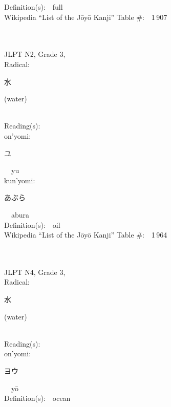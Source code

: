 \begin{multicols}{2}
Definition(s):\ \ full \\
Wikipedia ``List of the J\=oy\=o Kanji'' Table \#:\ \ 1\,907 \\
\ \ \\
{\fontsize{34pt}{40pt}  }\ \ \\  %
{JLPT N2, Grade 3, \\Radical:\ \ {\begin{CJK}{UTF8}{min} 水 \end{CJK}} (water) } \\
Reading(s):\ \ \\
{\hspace*{1em}}on'yomi:\ \ \\
{\hspace*{2em}}{\begin{CJK}{UTF8}{min} ユ \end{CJK}}\ \ yu\ \ \\
{\hspace*{1em}}kun'yomi:\ \ \\
{\hspace*{2em}}{\begin{CJK}{UTF8}{min} あぶら \end{CJK}}\ \ abura\ \ \\
Definition(s):\ \ oil \\
Wikipedia ``List of the J\=oy\=o Kanji'' Table \#:\ \ 1\,964 \\
\ \ \\
{\fontsize{34pt}{40pt}  }\ \ \\  %
{JLPT N4, Grade 3, \\Radical:\ \ {\begin{CJK}{UTF8}{min} 水 \end{CJK}} (water) } \\
Reading(s):\ \ \\
{\hspace*{1em}}on'yomi:\ \ \\
{\hspace*{2em}}{\begin{CJK}{UTF8}{min} ヨウ \end{CJK}}\ \ y\=o\ \ \\
Definition(s):\ \ ocean \\

\end{multicols}
